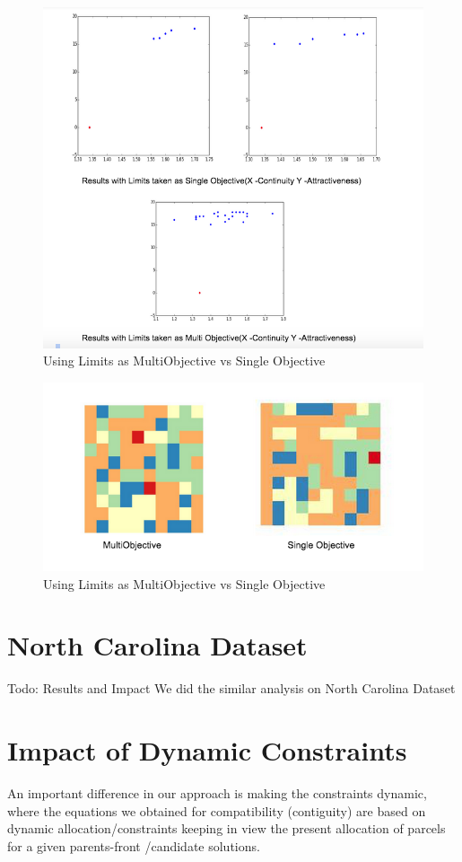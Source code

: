 \documentclass[twoside,10pt]{article}
\begin{document}
\begin{figure}[h]
\begin{center}
\includegraphics[width=5.in]{comp.png}
\caption{Using Limits as MultiObjective vs Single Objective}
\end{center}
\end{figure}


\begin{figure}[h]
\begin{center}
\includegraphics[width=4.in]{mvs.png}
\caption{Using Limits as MultiObjective vs Single Objective}
\end{center}
\end{figure}
\newpage
\section{North Carolina Dataset}
Todo: Results and Impact
We did the similar analysis on North Carolina Dataset
\section{Impact of Dynamic Constraints}
An important difference in our approach is making the constraints dynamic, where the equations we obtained  for compatibility (contiguity) are based on dynamic allocation/constraints keeping in view the present allocation of parcels for a given parents-front /candidate solutions.\\
\end{document}
